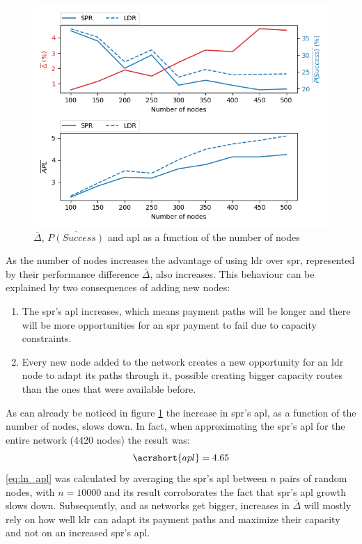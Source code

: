 \begin{figure}[H]
\begin{center}
  \includegraphics[width=\linewidth]{images/simulation_results5.png}
  \caption{$\overline{\Delta}$, $\overline{P(Success)}$ and \acrshort{apl} as a function of the number of nodes}
  \label{fig:simulation_results5}
  \end{center}
\end{figure}

As the number of nodes increases the advantage of using \acrshort{ldr} over \acrshort{spr}, represented by their performance difference $\overline{\Delta}$, also increases. This behaviour can be explained by two consequences of adding new nodes:
\begin{enumerate}
	\item The \acrshort{spr}'s \acrshort{apl} increases, which means payment paths will be longer and there will be more opportunities for an \acrshort{spr} payment to fail due to capacity constraints.
	\item Every new node added to the network creates a new opportunity for an \acrshort{ldr} node to adapt its paths through it, possible creating bigger capacity routes than the ones that were available before.
\end{enumerate}

As can already be noticed in figure \ref{fig:simulation_results5} the increase in \acrshort{spr}'s \acrshort{apl}, as a function of the number of nodes, slows down. In fact, when approximating the \acrshort{spr}'s \acrshort{apl} for the entire network (4420 nodes) the result was:
 \begin{equation}
     \acrshort{apl} = 4.65
\label{eq:ln_apl}
 \end{equation}
 \ref{eq:ln_apl} was calculated by averaging the \acrshort{spr}'s \acrshort{apl} between $n$ pairs of random nodes, with $n=10000$ and its result corroborates the fact that \acrshort{spr}'s \acrshort{apl} growth slows down. Subsequently, and as networks get bigger, increases in $\overline{\Delta}$ will mostly rely on how well \acrshort{ldr} can adapt its payment paths and maximize their capacity and not on an increased \acrshort{spr}'s \acrshort{apl}.\\ 
